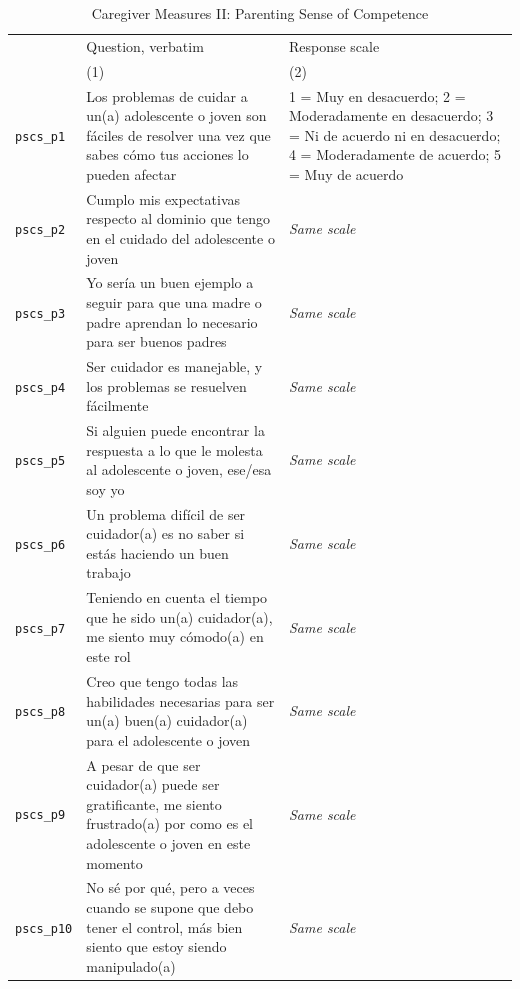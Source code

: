 \begin{table}[htbp]\centering
\caption{Caregiver Measures II: Parenting Sense of Competence}
\label{tab:a_pscs}
\footnotesize\renewcommand{\arraystretch}{0.92}
\begin{threeparttable}
\begin{tabular}{@{}p{68pt}p{212pt}p{150pt}@{}}
\toprule
 & Question, verbatim & Response scale \\
 & (1) & (2) \\
\midrule
\texttt{pscs\_p1} & Los problemas de cuidar a un(a) adolescente o joven son fáciles de resolver una vez que sabes cómo tus acciones lo pueden afectar & 1 = Muy en desacuerdo; 2 = Moderadamente en desacuerdo; 3 = Ni de acuerdo ni en desacuerdo; 4 = Moderadamente de acuerdo; 5 = Muy de acuerdo \\
\addlinespace[1pt]
\texttt{pscs\_p2} & Cumplo mis expectativas respecto al dominio que tengo en el cuidado del adolescente o joven & \textit{Same scale} \\
\addlinespace[1pt]
\texttt{pscs\_p3} & Yo sería un buen ejemplo a seguir para que una madre o padre aprendan lo necesario para ser buenos padres & \textit{Same scale} \\
\addlinespace[1pt]
\texttt{pscs\_p4} & Ser cuidador es manejable, y los problemas se resuelven fácilmente & \textit{Same scale} \\
\addlinespace[1pt]
\texttt{pscs\_p5} & Si alguien puede encontrar la respuesta a lo que le molesta al adolescente o joven, ese/esa soy yo & \textit{Same scale} \\
\addlinespace[1pt]
\texttt{pscs\_p6} & Un problema difícil de ser cuidador(a) es no saber si estás haciendo un buen trabajo & \textit{Same scale} \\
\addlinespace[1pt]
\texttt{pscs\_p7} & Teniendo en cuenta el tiempo que he sido un(a) cuidador(a), me siento muy cómodo(a) en este rol & \textit{Same scale} \\
\addlinespace[1pt]
\texttt{pscs\_p8} & Creo que tengo todas las habilidades necesarias para ser un(a) buen(a) cuidador(a) para el adolescente o joven & \textit{Same scale} \\
\addlinespace[1pt]
\texttt{pscs\_p9} & A pesar de que ser cuidador(a) puede ser gratificante, me siento frustrado(a) por como es el adolescente o joven en este momento & \textit{Same scale} \\
\addlinespace[1pt]
\texttt{pscs\_p10} & No sé por qué, pero a veces cuando se supone que debo tener el control, más bien siento que estoy siendo manipulado(a) & \textit{Same scale} \\

\end{tabular}
\end{threeparttable}
\end{table}
